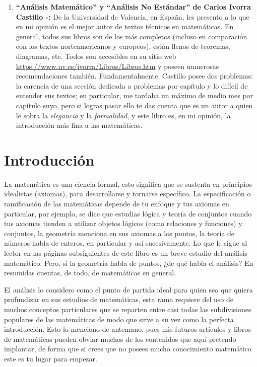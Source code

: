 \documentclass[11pt,oneside,a4paper]{book}
\begin{document}
\begin{enumerate}
\item \textbf{``Análisis Matemático'' y ``Análisis No Estándar'' de Carlos Ivorra Castillo \cite{castillo2018analisis}-\cite{castillo2018ane}:} De la Universidad de Valencia, en España, les presento a lo que en mi opinión es el mejor autor de textos técnicos en matemáticas. En general, todos sus libros son de los más completos (incluso en comparación con los textos norteamericanos y europeos), están llenos de teoremas, diagramas, etc. Todos son accesibles en su sitio web \url{https://www.uv.es/ivorra/Libros/Libros.htm} y poseen numerosas recomendaciones también. Fundamentalmente, Castillo posee dos problemas: la carencia de una sección dedicada a problemas por capítulo y lo difícil de entender sus textos; en particular, me tardaba un máximo de medio mes por capítulo suyo, pero si logras pasar ello te das cuenta que es un autor a quien le sobra la \textit{elegancia} y la \textit{formalidad}, y este libro es, en mi opinión, la introducción más fina a las matemáticas.
\end{enumerate}

\chapter*{Introducción}
La matemática es una ciencia formal, esto significa que se sustenta en principios idealistas (axiomas), para desarrollarse y tornarse específico. La especificación o ramificación de las matemáticas depende de tu enfoque y tus axiomas en particular, por ejemplo, se dice que estudias lógica y teoría de conjuntos cuando tus axiomas tienden a utilizar objetos lógicos (como relaciones y funciones) y conjuntos, la geometría menciona en sus axiomas a los puntos, la teoría de números habla de enteros, en particular y así sucesivamente. Lo que le sigue al lector en las páginas subsiguientes de este libro es un breve estudio del análisis matemático. Pero, si la geometría habla de puntos, ¿de qué habla el análisis? En resumidas cuentas, de todo, de matemáticas en general.

El análisis lo considero como el punto de partida ideal para quien sea que quiera profundizar en sus estudios de matemáticas, esta rama requiere del uso de muchos conceptos particulares que se reparten entre casi todas las subdivisiones populares de las matemáticas de modo que sirve a su vez como la perfecta introducción. Esto lo menciono de antemano, pues mis futuros artículos y libros de matemáticas pueden obviar muchos de los contenidos que aquí pretendo implantar, de forma que si crees que no posees mucho conocimiento matemático este es tu lugar para empezar.
\end{document}
